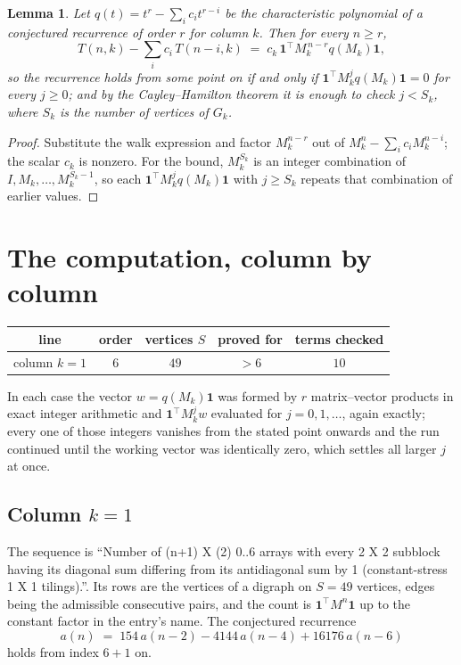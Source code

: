 \documentclass[11pt,a4paper]{article}
\theoremstyle{plain}
\newtheorem{lemma}[theorem]{Lemma}
\theoremstyle{definition}
\begin{document}
\begin{lemma}\label{lem:crit}
Let $q(t)=t^{r}-\sum_i c_it^{r-i}$ be the characteristic polynomial of a conjectured
recurrence of order $r$ for column $k$. Then for every $n\ge r$,
\[
T(n,k)-\sum_i c_i\,T(n-i,k)\;=\;c_k\,\mathbf{1}^{\!\top}M_k^{\,n-r}q(M_k)\mathbf{1},
\]
so the recurrence holds from some point on if and only if
$\mathbf{1}^{\!\top}M_k^{j}q(M_k)\mathbf{1}=0$ for every $j\ge0$; and by the
Cayley--Hamilton theorem it is enough to check $j<S_k$, where $S_k$ is the number of vertices
of $G_k$.
\end{lemma}

\begin{proof}
Substitute the walk expression and factor $M_k^{n-r}$ out of $M_k^{n}-\sum_ic_iM_k^{n-i}$;
the scalar $c_k$ is nonzero. For the bound, $M_k^{S_k}$ is an integer combination of
$I,M_k,\dots,M_k^{S_k-1}$, so each $\mathbf{1}^{\!\top}M_k^{j}q(M_k)\mathbf{1}$ with
$j\ge S_k$ repeats that combination of earlier values.
\end{proof}

\section{The computation, column by column}

\begin{center}
\begin{tabular}{ccccc}
line & order & vertices $S$ & proved for & terms checked \\ \hline
column $k$$=1$ & $6$ & $49$ & $>6$ & $10$ \\
\end{tabular}
\end{center}

In each case the vector $w=q(M_k)\mathbf{1}$ was formed by $r$ matrix--vector products in
exact integer arithmetic and $\mathbf{1}^{\!\top}M_k^{j}w$ evaluated for $j=0,1,\dots$,
again exactly; every one of those integers vanishes from the stated point onwards and the run
continued until the working vector was identically zero, which settles all larger $j$ at once.

\subsection*{Column $k$$=1$}
The sequence is ``Number of (n+1) X (2) 0..6 arrays with every 2 X 2 subblock having its diagonal sum differing from its antidiagonal sum by 1 (constant-stress 1 X 1 tilings).''. Its rows are the vertices of a digraph on
$S=49$ vertices, edges being the admissible consecutive pairs, and the count is
$\mathbf{1}^{\!\top}M^{n}\mathbf{1}$ up to the constant factor in the entry's name.
The conjectured recurrence
\[
a(n)\;=\;154\,a(n-2) - 4144\,a(n-4) + 16176\,a(n-6)
\]
holds from index $6+1$ on.
\end{document}

